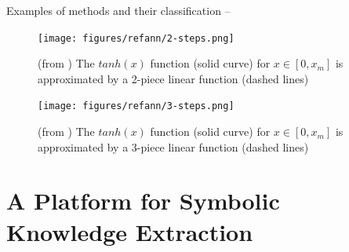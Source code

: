 \documentclass[presentation]{beamer}\mode<presentation>{\usetheme{AMSBolognaFC}}
\begin{document}
\begin{frame}[allowframebreaks]{Examples of methods and their classification -- }
    \begin{figure}\centering
        \texttt{[image: figures/refann/2-steps.png]}
        \caption{(from \cite{setiono2002extraction}) The $tanh(x)$ function (solid curve) for $x \in [0,x_m]$ is approximated by a 2-piece linear function (dashed lines)}
    \end{figure}

    \begin{figure}\centering
        \texttt{[image: figures/refann/3-steps.png]}
        \caption{(from \cite{setiono2002extraction}) The $tanh(x)$ function (solid curve) for $x \in [0,x_m]$ is approximated by a 3-piece linear function (dashed lines)}
    \end{figure}
    
\end{frame}

\section{A Platform for Symbolic Knowledge Extraction}
\end{document}
